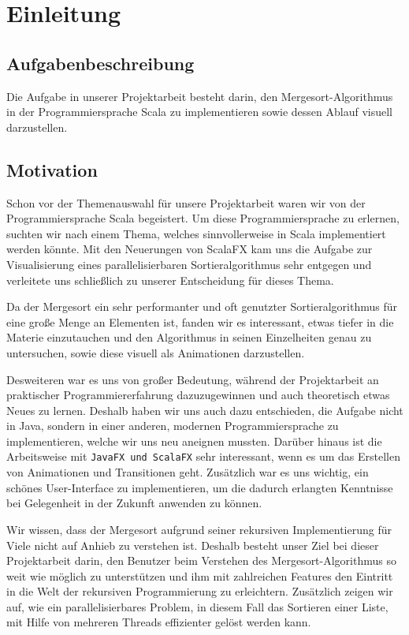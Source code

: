\chapter{Einleitung}\label{chap:intro}
\section{Aufgabenbeschreibung}
Die Aufgabe in unserer Projektarbeit besteht darin, den Mergesort-Algorithmus in der Programmiersprache Scala zu implementieren sowie dessen Ablauf visuell darzustellen.
\section{Motivation}
Schon vor der Themenauswahl für unsere Projektarbeit waren wir von der Programmiersprache Scala begeistert. Um diese Programmiersprache zu erlernen, suchten wir nach einem Thema, welches sinnvollerweise in Scala implementiert werden könnte. Mit den Neuerungen von ScalaFX kam uns die Aufgabe zur Visualisierung eines parallelisierbaren Sortieralgorithmus sehr entgegen und verleitete uns schließlich zu unserer Entscheidung für dieses Thema.

Da der Mergesort ein sehr performanter und oft genutzter Sortieralgorithmus für eine große Menge an Elementen ist, fanden wir es interessant, etwas tiefer in die Materie einzutauchen und den Algorithmus in seinen Einzelheiten genau zu untersuchen, sowie diese visuell als Animationen darzustellen.

Desweiteren war es uns von großer Bedeutung, während der Projektarbeit an praktischer Programmiererfahrung dazuzugewinnen und auch theoretisch etwas Neues zu lernen. Deshalb haben wir uns auch dazu entschieden, die Aufgabe nicht in Java, sondern in einer anderen, modernen Programmiersprache zu implementieren, welche wir uns neu aneignen mussten. Darüber hinaus ist die Arbeitsweise mit \texttt{JavaFX und ScalaFX} sehr interessant, wenn es um das Erstellen von Animationen und Transitionen geht. Zu\-sätz\-lich war es uns wichtig, ein schönes User-Interface zu implementieren, um die dadurch erlangten Kenntnisse bei Gelegenheit in der Zukunft anwenden zu können.

Wir wissen, dass der Mergesort aufgrund seiner rekursiven Implementierung für Viele nicht auf Anhieb zu verstehen ist. Deshalb besteht unser Ziel bei dieser Projektarbeit darin, den Benutzer beim Verstehen des Mergesort-Algorithmus so weit wie möglich zu unterstützen und ihm mit zahlreichen Features den Eintritt in die Welt der rekursiven Programmierung zu erleichtern. Zusätzlich zeigen wir auf, wie ein parallelisierbares Problem, in diesem Fall das Sortieren einer Liste, mit Hilfe von mehreren Threads effizienter gelöst werden kann.


